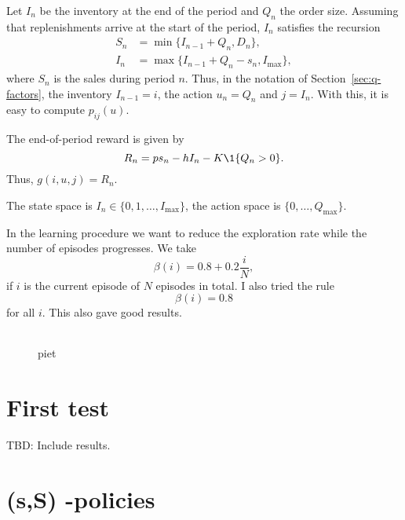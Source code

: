 \documentclass{article}
\begin{document}
Let $I_n$ be the inventory at the end of the period and $Q_n$ the order size. Assuming that replenishments arrive at the start of the period, $I_n$ satisfies the recursion
\begin{align*}
S_n&=\min\{I_{n-1} + Q_n, D_n\}, \\
I_n&=\max\{I_{n-1}+Q_n - s_n, I_{\max}\}, 
\end{align*}
where $S_n$ is the sales during period $n$.
Thus, in the notation of Section~\ref{sec:q-factors},  the inventory $I_{n-1}=i$, the action  
$u_n=Q_n$ and  $j=I_n$. With this, it is easy to compute $p_{ij}(u)$. 

The end-of-period reward is given by
\begin{equation*}
 R_n = p s_n - h I_n - K \1{Q_n > 0}.
\end{equation*}
Thus, $g(i,u, j) = R_n$.

The state space is  $I_n \in \{0, 1, \ldots, I_{\max}\}$, the action space is $\{0, \ldots, Q_{\max}\}$. 

In the learning procedure we want to reduce the exploration rate while the number of episodes progresses. We take
\begin{equation*}
  \beta(i) = 0.8 + 0.2\frac i N,
\end{equation*}
if $i$ is the current episode of $N$ episodes in total. I also tried the rule
\begin{equation*}
  \beta(i) = 0.8 
\end{equation*}
for all $i$. This also gave good results.


\begin{figure}[tb]
  \centering
  \begin{tabular}[h]{cc}
  \end{tabular}
  \caption{piet}
\end{figure}




\section{First test}

TBD: Include results.

\section{(s,S) -policies}
\label{sec:s-s-policies}
\end{document}
